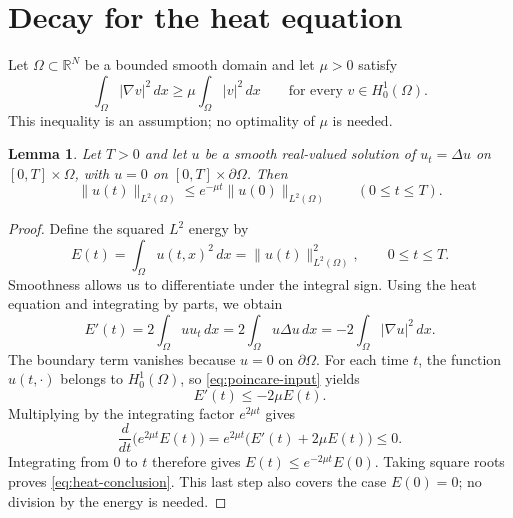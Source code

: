 \documentclass{article}
\newcommand{\Om}{\Omega}
\newtheorem{lemma}{Lemma}
\begin{document}
\section{Decay for the heat equation}
Let $\Om\subset\mathbb R^N$ be a bounded smooth domain and let $\mu>0$
satisfy
\begin{equation}\label{eq:poincare-input}
 \int_{\Om}|\nabla v|^2\,dx\ge\mu\int_{\Om}|v|^2\,dx
 \qquad\text{for every }v\in H_0^1(\Om).
\end{equation}
This inequality is an assumption; no optimality of $\mu$ is needed.
\begin{lemma}\label{lem:heat-decay}
Let $T>0$ and let $u$ be a smooth real-valued solution of
$u_t=\Delta u$ on $[0,T]\times\Om$, with $u=0$ on
$[0,T]\times\partial\Om$. Then
\begin{equation}\label{eq:heat-conclusion}
 \|u(t)\|_{L^2(\Om)}\le e^{-\mu t}\|u(0)\|_{L^2(\Om)}
 \qquad(0\le t\le T).
\end{equation}
\end{lemma}
\begin{proof}
Define the squared $L^2$ energy by
\[
 E(t)=\int_{\Om}u(t,x)^2\,dx=\|u(t)\|_{L^2(\Om)}^2,
 \qquad 0\le t\le T.
\]
Smoothness allows us to differentiate under the integral sign. Using the
heat equation and integrating by parts, we obtain
\[
 E'(t)=2\int_{\Om}u u_t\,dx
      =2\int_{\Om}u\Delta u\,dx
      =-2\int_{\Om}|\nabla u|^2\,dx.
\]
The boundary term vanishes because $u=0$ on $\partial\Om$.
For each time $t$, the function $u(t,\cdot)$ belongs to $H_0^1(\Om)$, so
\eqref{eq:poincare-input} yields
\[
 E'(t)\le -2\mu E(t).
\]
Multiplying by the integrating factor $e^{2\mu t}$ gives
\[
 \frac{d}{dt}\bigl(e^{2\mu t}E(t)\bigr)
 =e^{2\mu t}\bigl(E'(t)+2\mu E(t)\bigr)\le0.
\]
Integrating from $0$ to $t$ therefore gives
$E(t)\le e^{-2\mu t}E(0)$. Taking square roots proves
\eqref{eq:heat-conclusion}. This last step also covers the case $E(0)=0$;
no division by the energy is needed.
\end{proof}
\end{document}
